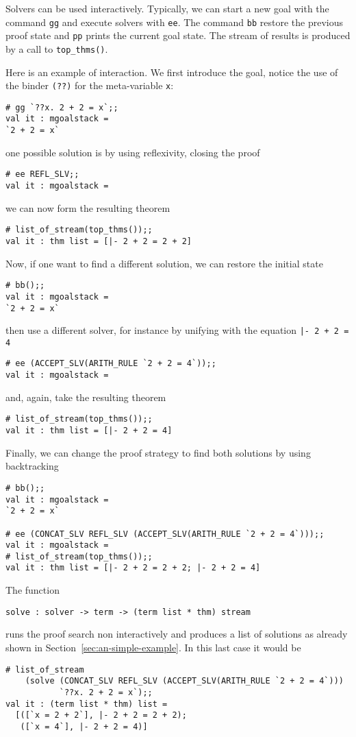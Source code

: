 Solvers can be used interactively.  Typically, we can start a new goal
with the command \verb|gg| and execute solvers with \verb|ee|.  The
command \verb|bb| restore the previous proof state and \verb|pp|
prints the current goal state.  The stream of results is produced by
a call to \verb|top_thms()|.

Here is an example of interaction.  We first introduce the goal,
notice the use of the binder \verb|(??)| for the meta-variable \verb|x|:
\begin{verbatim}
# gg `??x. 2 + 2 = x`;;
val it : mgoalstack = 
`2 + 2 = x`
\end{verbatim}
one possible solution is by using reflexivity, closing the proof
\begin{verbatim}
# ee REFL_SLV;;
val it : mgoalstack = 
\end{verbatim}
we can now form the resulting theorem
\begin{verbatim}
# list_of_stream(top_thms());;
val it : thm list = [|- 2 + 2 = 2 + 2]
\end{verbatim}

Now, if one want to find a different solution, we can restore the
initial state
\begin{verbatim}
# bb();;
val it : mgoalstack = 
`2 + 2 = x`
\end{verbatim}
then use a different solver, for instance by unifying with the
equation \verb?|- 2 + 2 = 4?
\begin{verbatim}
# ee (ACCEPT_SLV(ARITH_RULE `2 + 2 = 4`));;
val it : mgoalstack = 
\end{verbatim}
and, again, take the resulting theorem
\begin{verbatim}
# list_of_stream(top_thms());;
val it : thm list = [|- 2 + 2 = 4]
\end{verbatim}

Finally, we can change the proof strategy to find both solutions by
using backtracking
\begin{verbatim}
# bb();;
val it : mgoalstack = 
`2 + 2 = x`

# ee (CONCAT_SLV REFL_SLV (ACCEPT_SLV(ARITH_RULE `2 + 2 = 4`)));;
val it : mgoalstack = 
# list_of_stream(top_thms());;
val it : thm list = [|- 2 + 2 = 2 + 2; |- 2 + 2 = 4]
\end{verbatim}

The function
\begin{verbatim}
solve : solver -> term -> (term list * thm) stream
\end{verbatim}
runs the proof search non interactively and produces a list of
solutions as already shown in Section~\ref{sec:an-simple-example}.  In
this last case it would be
\begin{verbatim}
# list_of_stream
    (solve (CONCAT_SLV REFL_SLV (ACCEPT_SLV(ARITH_RULE `2 + 2 = 4`)))
           `??x. 2 + 2 = x`);;
val it : (term list * thm) list =
  [([`x = 2 + 2`], |- 2 + 2 = 2 + 2);
   ([`x = 4`], |- 2 + 2 = 4)]
\end{verbatim}


